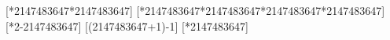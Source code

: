 \documentclass{article}
\begin{document}
[\the{}*2147483647*2147483647\relax]
[\the{}*2147483647*2147483647*2147483647*2147483647\relax]
[\the{}*2-2147483647\relax]
[\the\numexpr (2147483647+1)-1\relax]
[\the\dimexpr {}*2147483647\relax]
\end{document}
